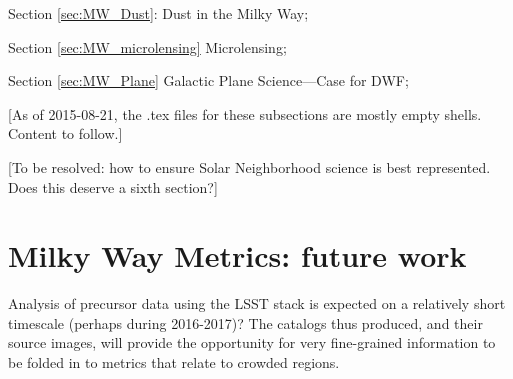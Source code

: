 Section \ref{sec:MW_Dust}: Dust in the Milky Way;

Section \ref{sec:MW_microlensing} Microlensing;

Section \ref{sec:MW_Plane} Galactic Plane Science---Case for DWF;







[As of 2015-08-21, the .tex files for these subsections are mostly
  empty shells. Content to follow.]

[To be resolved: how to ensure Solar Neighborhood science is best represented. Does this deserve a sixth section?]








%
%
%
%

\section{Milky Way Metrics: future work}
\def\secname{MW_future_work}\label{sec:\secname}

Analysis of precursor data using the LSST stack is expected on a
relatively short timescale (perhaps during 2016-2017)? The catalogs
thus produced, and their source images, will provide the opportunity
for very fine-grained information to be folded in to metrics that
relate to crowded regions.


\navigationbar



